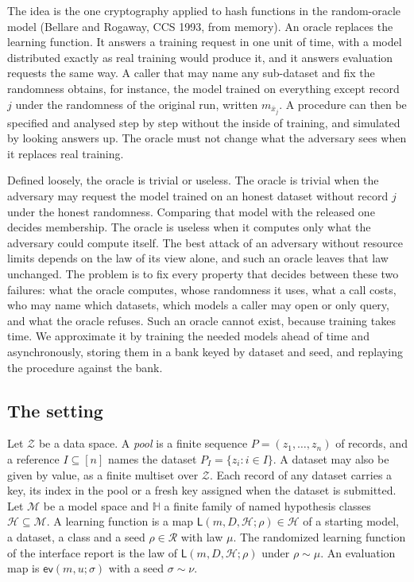 \documentclass{labreport}
\newcommand{\Z}{\mathcal{Z}}
\newcommand{\Mc}{\mathcal{M}}
\newcommand{\Hc}{\mathcal{H}}
\newcommand{\HH}{\mathbb{H}}
\newcommand{\Lf}{\mathsf{L}}
\newcommand{\ev}{\mathsf{ev}}
\newcommand{\Rc}{\mathcal{R}}
\begin{document}
The idea is the one cryptography applied to hash functions in the random-oracle
model (Bellare and Rogaway, CCS 1993, from memory). An oracle replaces the
learning function. It answers a training request in one unit of time, with a
model distributed exactly as real training would produce it, and it answers
evaluation requests the same way. A caller that may name any sub-dataset and fix
the randomness obtains, for instance, the model trained on everything except
record $j$ under the randomness of the original run, written $m_{\bar{x}_j}$. A
procedure can then be specified and analysed step by step without the inside of
training, and simulated by looking answers up. The oracle must not change what
the adversary sees when it replaces real training.

Defined loosely, the oracle is trivial or useless. The oracle is trivial when
the adversary may request the model trained on an honest dataset without record
$j$ under the honest randomness. Comparing that model with the released one
decides membership. The oracle is useless when it computes only what the
adversary could compute itself. The best attack of an adversary without resource
limits depends on the law of its view alone, and such an oracle leaves that law
unchanged. The problem is to fix every property that decides between these
two failures: what the oracle computes, whose randomness it uses, what a call
costs, who may name which datasets, which models a caller may open or only
query, and what the oracle refuses. Such an oracle cannot exist, because
training takes time. We approximate it by training the needed models ahead of
time and asynchronously, storing them in a bank keyed by dataset and seed, and
replaying the procedure against the bank.

\subsection*{The setting}
Let $\Z$ be a data space. A \emph{pool} is a finite sequence
$P=(z_1,\dots,z_n)$ of records, and a reference $I\subseteq[n]$ names the dataset
$P_I=\{z_i: i\in I\}$. A dataset may also be given by value, as a finite multiset
over $\Z$. Each record of any dataset carries a key, its index in the pool or a
fresh key assigned when the dataset is submitted. Let $\Mc$ be a model space and
$\HH$ a finite family of named hypothesis classes $\Hc\subseteq\Mc$. A learning
function is a map $\Lf(m,D,\Hc;\rho)\in\Hc$ of a starting model, a dataset, a
class and a seed $\rho\in\Rc$ with law $\mu$. The randomized learning function
of the interface report is the law of $\Lf(m,D,\Hc;\rho)$ under $\rho\sim\mu$.
An evaluation map is $\ev(m,u;\sigma)$ with a seed $\sigma\sim\nu$.
\end{document}
